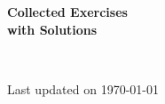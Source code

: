%


\ifprintanswers\else
  \renewenvironment{solutionorbox}[1][]{\begin{solution}}{\end{solution}}
\fi

\runningheader{{\scshape\coursename}}{}{\thepage}
\runningfooter{}{}{\copyright~\lecturer, \the\year}

\providecommand{\collectiontitle}{Collected Exercises}
\providecommand{\collectionsections}{%
  \clearpage
  \clearpage
}



\begin{titlepage}
  \centering
  \vspace*{0.25\textheight}
  {\Large\scshape \coursename\par}
  \vspace{1em}
  {\huge\bfseries \collectiontitle\ifprintanswers\\ with Solutions\fi\par}
  \vspace{1.5em}
  {\normalsize \lecturer\\ \institution\par}
  \vspace{2em}
  {\normalsize \term\par}
  \vfill
  {\small Last updated on \today\par}
\end{titlepage}

\tableofcontents

\collectionsections


